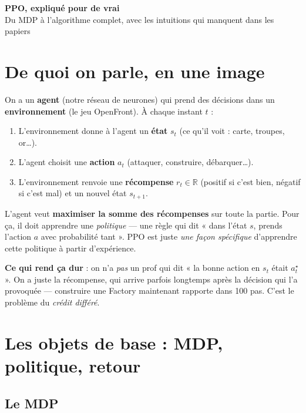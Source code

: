 \documentclass[a4paper,11pt]{article}
\theoremstyle{clean}
\newcommand{\R}{\mathbb{R}}
\begin{document}
\begin{center}\textbf{\LARGE PPO, expliqué pour de vrai}\\[2pt]
\small Du MDP à l'algorithme complet, avec les intuitions qui manquent dans les papiers\end{center}

\section{De quoi on parle, en une image}

On a un \textbf{agent} (notre réseau de neurones) qui prend des décisions dans un \textbf{environnement} (le jeu OpenFront). À chaque instant $t$ :
\begin{enumerate}[nosep,leftmargin=1.5em]
\item L'environnement donne à l'agent un \textbf{état} $s_t$ (ce qu'il voit : carte, troupes, or\dots).
\item L'agent choisit une \textbf{action} $a_t$ (attaquer, construire, débarquer\dots).
\item L'environnement renvoie une \textbf{récompense} $r_t\in\R$ (positif si c'est bien, négatif si c'est mal) et un nouvel état $s_{t+1}$.
\end{enumerate}
L'agent veut \textbf{maximiser la somme des récompenses} sur toute la partie. Pour ça, il doit apprendre une \emph{politique} --- une règle qui dit « dans l'état $s$, prends l'action $a$ avec probabilité tant ». PPO est juste \emph{une façon spécifique} d'apprendre cette politique à partir d'expérience.

\textbf{Ce qui rend ça dur} : on n'a \emph{pas} un prof qui dit « la bonne action en $s_t$ était $a_t^\star$ ». On a juste la récompense, qui arrive parfois longtemps après la décision qui l'a provoquée --- construire une Factory maintenant rapporte dans 100 pas. C'est le problème du \emph{crédit différé}.

\section{Les objets de base : MDP, politique, retour}

\subsection{Le MDP}
\end{document}
